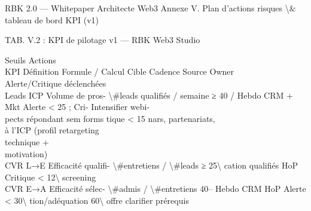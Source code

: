 RBK 2.0 — Whitepaper Architecte Web3                                                                      Annexe V. Plan d’actions risques \textbackslash{}& tableau de bord KPI (v1)\\
\vspace{0.5em}
\vspace{0.5em}
\begin{center}\begin{tabular}TAB. V.2 : KPI de pilotage v1 — RBK Web3 Studio\end{tabular}\end{center}
Seuils                Actions\\
KPI            Définition         Formule / Calcul             Cible   Cadence   Source     Owner\\
Alerte/Critique       déclenchées\\
Leads ICP      Volume de pros- \textbackslash{}#leads qualifiés / semaine ≥ 40 / Hebdo           CRM +      Mkt       Alerte \textless{} 25 ; Cri-    Intensifier webi-\\
pects répondant                            sem                    forms                tique \textless{} 15            nars, partenariats,\\
à l’ICP (profil                                                                                              retargeting\\
technique +\\
motivation)\\
CVR L→E        Efficacité qualifi- \textbackslash{}#entretiens / \textbackslash{}#leads   ≥ 25\textbackslash{}%
cation              qualifiés                                                HoP       Critique \textless{} 12\textbackslash{}%
screening\\
CVR E→A        Efficacité sélec- \textbackslash{}#admis / \textbackslash{}#entretiens          40–     Hebdo     CRM        HoP       Alerte \textless{} 30\textbackslash{}%
tion/adéquation                                 60\textbackslash{}%
offre                                                                                                        clarifier prérequis\\
